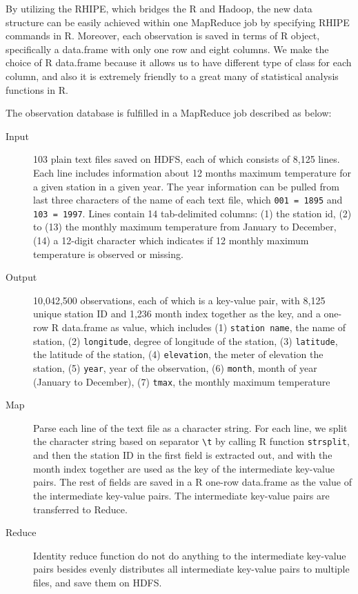 By utilizing the RHIPE, which bridges the R and Hadoop, the new data structure can
be easily achieved within one MapReduce job by specifying RHIPE commands in R.
Moreover, each observation is saved in terms of R object, specifically a data.frame
with only one row and eight columns.
We make the choice of R data.frame because it allows us to have different type of
class for each column, and also it is extremely friendly to a great many of
statistical analysis functions in R. 

The observation database is fulfilled in a MapReduce job described as
below:

\begin{description}
  \item[Input] 103 plain text files saved on HDFS, each of which consists of 8,125 
  lines. Each line includes information about 12 months maximum temperature for a 
  given station in a given year. The year information can be pulled from last three
  characters of the name of each text file, which \texttt{001 = 1895} and 
  \texttt{103 = 1997}. Lines contain 14 tab-delimited columns:
  (1) the station id, (2) to (13) the monthly maximum temperature from January to
  December, (14) a 12-digit character which indicates if 12 monthly maximum 
  temperature is observed or missing. 
  \item[Output] 10,042,500 observations, each of which is a key-value pair, with 
  8,125 unique station ID and 1,236 month index together as the key, and a one-row 
  R data.frame as value, which includes (1) 
  \texttt{station name}, the name of station, (2) \texttt{longitude}, degree of 
  longitude of the station, (3) \texttt{latitude}, the latitude of the station, (4)
  \texttt{elevation}, the meter of elevation the station, (5) \texttt{year}, year 
  of the observation, (6) \texttt{month}, month of year (January to December), 
  (7) \texttt{tmax}, the monthly maximum temperature
  \item[Map] Parse each line of the text file as a character string. For each line,
  we split the character string based on separator \texttt{\textbackslash t} by 
  calling R function \texttt{strsplit}, and then the station ID in the first field 
  is extracted out, and with the month index together are used as the key of the 
  intermediate key-value pairs. The rest of fields are saved in a R one-row 
  data.frame as the value of the intermediate key-value pairs. The intermediate 
  key-value pairs are transferred to Reduce. 
  \item[Reduce] Identity reduce function do not do anything to the intermediate 
  key-value pairs besides evenly distributes all intermediate key-value pairs to 
  multiple files, and save them on HDFS.
\end{description}

